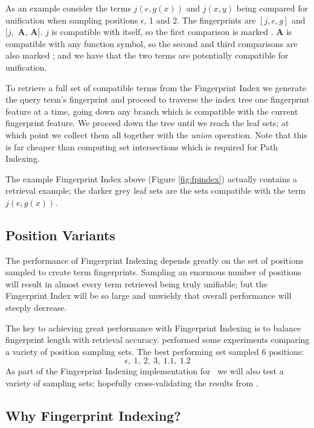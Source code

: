 As an example consider the terms $j(e, g(x))$ and $j(x,y)$ being compared for unification
when sampling positions $\epsilon$, 1 and 2. The fingerprints are $[j, e, g]$ and $[j,$ \textbf{A}, \textbf{A}$]$. 
$j$ is compatible with itself, so the first comparison is marked \compY. \textbf{A} is compatible with
any function symbol, so the second and third comparisons are also marked \compY; and
we have that the two terms are potentially compatible for unification.

To retrieve a full set of compatible terms from the Fingerprint Index we generate
the query term's fingerprint and proceed to traverse the index tree one fingerprint
feature at a time, going down any branch which is compatible with the current
fingerprint feature. We proceed down the tree until we reach the leaf sets; at which
point we collect them all together with the \emph{union} operation. Note that this
is far cheaper than computing set intersections which is required for Path Indexing.

The example Fingerprint Index above (Figure \ref{fig:fpindex}) actually contains a retrieval example;
the darker grey leaf sets are the sets compatible with the term $j(e, g(x))$.

\subsection{Position Variants}

The performance of Fingerprint Indexing depends greatly on the set of positions sampled
to create term fingerprints. Sampling an enormous number of positions will result in
almost every term retrieved being truly unifiable; but the Fingerprint Index will
be so large and unwieldy that overall performance will steeply decrease.

The key to achieving great performance with Fingerprint Indexing is to balance
fingerprint length with retrieval accuracy.  performed some experiments
comparing a variety of position sampling sets. The best performing set sampled
6 positions:
  \[\epsilon,\  1,\  2,\  3,\  1.1,\  1.2\]
As part of the Fingerprint Indexing implementation for \beagle\ we will also test
a variety of sampling sets; hopefully cross-validating the results from .

\subsection{Why Fingerprint Indexing?}

